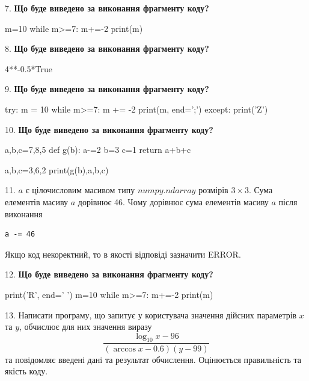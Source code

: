 \documentclass[11pt]{article}
\begin{document}
7. \textbf{Що буде виведено за виконання фрагменту коду?}

m=10
while m>=7:
    m+=-2
print(m)

\par\vspace{5mm}

8. \textbf{Що буде виведено за виконання фрагменту коду?}

4**-0.5*True
\par\vspace{5mm}

9. \textbf{Що буде виведено за виконання фрагменту коду?}

try:
    m = 10
    while m>=7:
        m += -2
    print(m, end=';')
except:
    print('Z')

\par\vspace{5mm}

10. \textbf{Що буде виведено за виконання фрагменту коду?}

a,b,c=7,8,5
def g(b):
    a-=2
    b=3
    c=1
    return a+b+c

a,b,c=3,6,2
print(g(b),a,b,c)
\par\vspace{5mm}

11. 
$a$ є цілочисловим масивом типу $numpy.ndarray$ розмірів $3{\times}3$. Сума елементів масиву $a$ дорівнює 46. Чому дорівнює сума елементів масиву $a$ після виконання 
\begin{verbatim}
a -= 46
\end{verbatim}


Якщо код некоректний, то в якості відповіді зазначити ERROR.


\par\vspace{5mm}

12. \textbf{Що буде виведено за виконання фрагменту коду?}

print('R', end=' ')
m=10
while m>=7:
    m+=-2
print(m)

\par\vspace{5mm}

13. 
Написати програму, що запитує у користувача значення дійсних параметрів $x$ та $y$, обчислює для них значення виразу 
$$\frac{\log_{10} x - 96}{(\arccos x - 0.6) (y - 99)}$$ 
та повiдомляє введенi данi та результат обчислення.
 Оцінюється правильність та якість коду.
\end{document}
